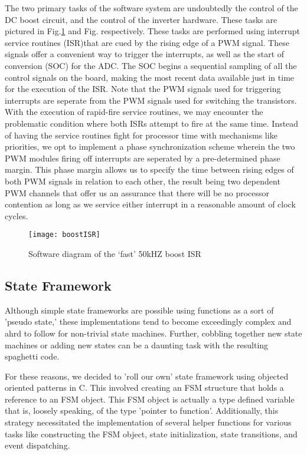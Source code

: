 The two primary tasks of the software system are undoubtedly the control of the DC boost circuit, and the control of the inverter hardware. These tasks are pictured in Fig.\ref{fast} and Fig.\cite{slow} respectively. These tasks are performed using interrupt service routines (ISR)that are cued by the rising edge of a PWM signal. These signals offer a convenient way to trigger the interrupts, as well as the start of conversion (SOC) for the ADC. The SOC begins a sequential sampling of all the control signals on the board, making the most recent data available just in time for the execution of the ISR. Note that the PWM signals used for triggering interrupts are seperate from the PWM signals used for switching the transistors. With the execution of rapid-fire service routines, we may encounter the problematic condition where both ISRs attempt to fire at the same time. Instead of having the service routines fight for processor time with mechanisms like priorities, we opt to implement a phase synchronization scheme wherein the two PWM modules firing off interrupts are seperated by a pre-determined phase margin. This phase margin allows us to specify the time between rising edges of both PWM signals in relation to each other, the result being two dependent PWM channels that offer us an assurance that there will be no processor contention as long as we service either interrupt in a reasonable amount of clock cycles.

\begin{figure}[h]
\begin{center}
\texttt{[image: boostISR]}
\caption{Software diagram of the `fast' 50kHZ boost ISR}
\label{fast}
\end{center}
\end{figure}

\subsection{State Framework}
Although simple state frameworks are possible using functions as a sort of 'pseudo state,' these implementations tend to become exceedingly complex and ahrd to follow for non-trivial state machines. Further, cobbling together new state machines or adding new states can be a daunting task with the resulting spaghetti code. 

For these reasons, we decided to 'roll our own' state framework using objected oriented patterns in C. This involved creating an FSM structure that holds a reference to an FSM object. This FSM object is actually a type defined variable that is, loosely speaking, of the type 'pointer to function'. Additionally, this strategy necessitated the implementation of several helper functions for various tasks like constructing the FSM object, state initialization, state transitions, and event dispatching. 

